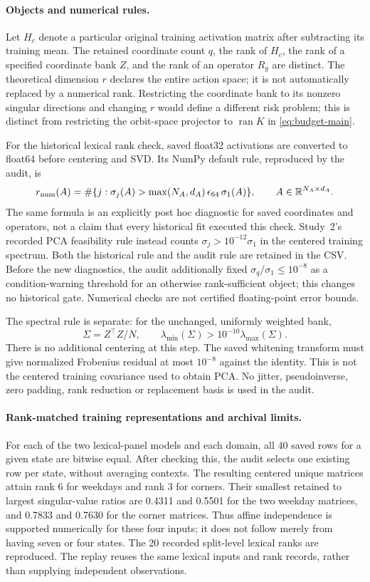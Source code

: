 \paragraph{Objects and numerical rules.}
Let $H_c$ denote a particular original training activation matrix after subtracting its training mean. The retained coordinate count $q$, the rank of $H_c$, the rank of a specified coordinate bank $Z$, and the rank of an operator $R_g$ are distinct. The theoretical dimension $r$ declares the entire action space; it is not automatically replaced by a numerical rank. Restricting the coordinate bank to its nonzero singular directions and changing $r$ would define a different risk problem; this is distinct from restricting the orbit-space projector to $\operatorname{ran}K$ in \cref{eq:budget-main}.

For the historical lexical rank check, saved float32 activations are converted to float64 before centering and SVD. Its NumPy default rule, reproduced by the audit, is
\[
 r_{\mathrm{num}}(A)
 =\#\{j:\sigma_j(A)>\max(N_A,d_A)\,\epsilon_{64}\,\sigma_1(A)\},
 \qquad A\in\mathbb{R}^{N_A\times d_A}.
\]
The same formula is an explicitly post hoc diagnostic for saved coordinates and operators, not a claim that every historical fit executed this check. Study~2's recorded PCA feasibility rule instead counts $\sigma_j>10^{-12}\sigma_1$ in the centered training spectrum. Both the historical rule and the audit rule are retained in the CSV. Before the new diagnostics, the audit additionally fixed $\sigma_q/\sigma_1\le10^{-8}$ as a condition-warning threshold for an otherwise rank-sufficient object; this changes no historical gate. Numerical checks are not certified floating-point error bounds.

The spectral rule is separate: for the unchanged, uniformly weighted bank,
\[
 \Sigma=Z^\top Z/N,\qquad
 \lambda_{\min}(\Sigma)>10^{-10}\lambda_{\max}(\Sigma).
\]
There is no additional centering at this step. The saved whitening transform must give normalized Frobenius residual at most $10^{-8}$ against the identity. This is not the centered training covariance used to obtain PCA. No jitter, pseudoinverse, zero padding, rank reduction or replacement basis is used in the audit.

\paragraph{Rank-matched training representations and archival limits.}
For each of the two lexical-panel models and each domain, all 40 saved rows for a given state are bitwise equal. After checking this, the audit selects one existing row per state, without averaging contexts. The resulting centered unique matrices attain rank 6 for weekdays and rank 3 for corners. Their smallest retained to largest singular-value ratios are 0.4311 and 0.5501 for the two weekday matrices, and 0.7833 and 0.7630 for the corner matrices. Thus affine independence is supported numerically for these four inputs; it does not follow merely from having seven or four states. The 20 recorded split-level lexical ranks are reproduced. The replay reuses the same lexical inputs and rank records, rather than supplying independent observations.

